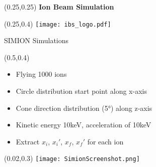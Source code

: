 \documentclass[10pt,aspectratio=169]{beamer}
\begin{document}
\begin{SectionTitle}
	\begin{frame}
		\begin{textblock*}{0.5\paperwidth}(0.25\paperwidth,0.25\paperheight)
			\centering
			\textbf{\LARGE Ion Beam Simulation}
		\end{textblock*}
		\begin{textblock*}{0.5\paperwidth}(0.25\paperwidth,0.4\paperheight)
			\centering
			\texttt{[image: ibs\_logo.pdf]}
		\end{textblock*}
	\end{frame}
 \end{SectionTitle}


\begin{frame}{SIMION Simulations}
    \begin{textblock*}{0.5\paperwidth}(0.5\paperwidth,0.4\paperheight)
        \centering
        \begin{itemize}
            \item Flying 1000 ions
            \item Circle distribution start point along x-axis
            \item Cone direction distribution (5°) along z-axis
            \item Kinetic energy 10keV, acceleration of 10keV
            \item Extract $x_i$, $x_i'$, $x_f$, $x_f'$ for each ion
        \end{itemize}
    \end{textblock*}
    \begin{textblock*}{0.5\paperwidth}(0.02\paperwidth,0.3\paperheight)
			\centering
			\texttt{[image: SimionScreenshot.png]}
		\end{textblock*}
  
\end{frame}
\end{document}
